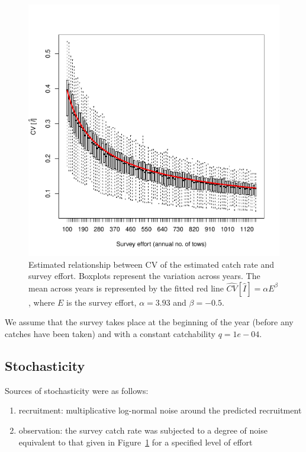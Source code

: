 \documentclass[a4paper]{article}
\begin{document}
\begin{figure}
\centering
\includegraphics{../dat/effCV.pdf}
\caption{Estimated relationship between CV of the estimated catch rate and survey effort. Boxplots represent the variation across years. 
The mean across years is represented by the fitted red line $\hat{CV}[\hat{I}] = \alpha E ^ \beta$, where $E$ is the survey effort,
$\alpha=3.93$ and $\beta = -0.5$.}
\label{fig:effCV}
\end{figure} 


We assume that the survey takes place at the beginning of the year (before any catches have been taken)
and with a constant catchability $q=1e-04$. 

\subsection{Stochasticity}


Sources of stochasticity were as follows:
\begin{enumerate}
\item recruitment: multiplicative log-normal noise around the predicted recruitment
\item observation: the survey catch rate was subjected to a degree of noise equivalent to that given in Figure~\ref{fig:effCV}
for a specified level of effort
\end{enumerate}
\end{document}
